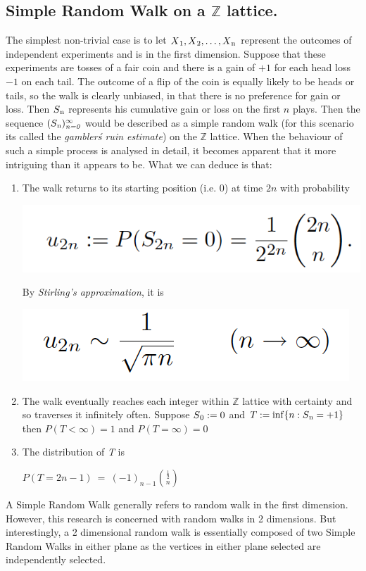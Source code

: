\documentclass{article}
\begin{document}
\subsection{Simple Random Walk on a $\mathbb{Z}$ lattice.}
	The simplest non-trivial case is to let $X\textsubscript{1}, X\textsubscript{2}, \ldots, X\textsubscript{n}$ represent the outcomes of independent experiments and is in the first dimension. Suppose that these experiments are tosses of a fair coin and there is a gain of $+1$ for each head loss $-1$ on each tail. The outcome of a flip of the coin is equally likely to be heads or tails, so the walk is clearly unbiased, in that there is no preference for gain or loss. Then $S\textsubscript{n}$ represents his cumulative gain or loss on the first $n$ plays.
Then the sequence $(S\textsubscript{n})_\emph{n=0}^\infty$ would be described as a simple random walk (for this scenario its called the \emph{gambler\' s ruin estimate}) on the $\mathbb{Z}$ lattice. When the behaviour of such a simple process is analysed in detail, it becomes apparent that it more intriguing than it appears to be. What we can deduce is that:
	\begin{enumerate}
	\item The walk returns to its starting position (i.e. 0) at time $2n$ with probability
		\begin{center}
			\includegraphics[scale=0.8]{WalkReturnToStartT2nProbability}
		\end{center}
		By \emph{Stirling's approximation}, it is
		\begin{center}
			\includegraphics[scale=0.8]{WalkReturnToStartTnProbability}
			\cite{Durrett2010}
		\end{center}
	\item The walk eventually reaches each integer within $\mathbb{Z}$ lattice with certainty and so traverses it infinitely often. Suppose $S\textsubscript{0} := 0$ and $T := \inf\{n : S\textsubscript{n} = +1\}$ then $P(T < \infty) = 1$ and $P(T = \infty) = 0$
	\item The distribution of \emph{T} is
		\begin{center}
			$P(T = 2n - 1)\ =\ (-1)_{n-1}\binom{\frac{1}{2}}{n}$
		\end{center}
	\end{enumerate}
A Simple Random Walk generally refers to random walk in the first dimension. However, this research is concerned with random walks in 2 dimensions. But interestingly, a 2 dimensional random walk is essentially composed of two Simple Random Walks in either plane as the vertices in either plane selected are independently selected.
\newline
\end{document}
